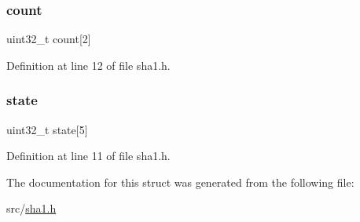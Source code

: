 \subsubsection{\texorpdfstring{count}{count}}
{\footnotesize\ttfamily uint32\+\_\+t count\mbox{[}2\mbox{]}}



Definition at line 12 of file sha1.\+h.

\mbox{\label{struct_s_h_a1___c_t_x_a81e965b2e6a5e3da77038538085d264a}} 
\subsubsection{\texorpdfstring{state}{state}}
{\footnotesize\ttfamily uint32\+\_\+t state\mbox{[}5\mbox{]}}



Definition at line 11 of file sha1.\+h.



The documentation for this struct was generated from the following file\+:\begin{DoxyCompactItemize}
\item 
src/\hyperlink{sha1_8h}{sha1.\+h}\end{DoxyCompactItemize}

